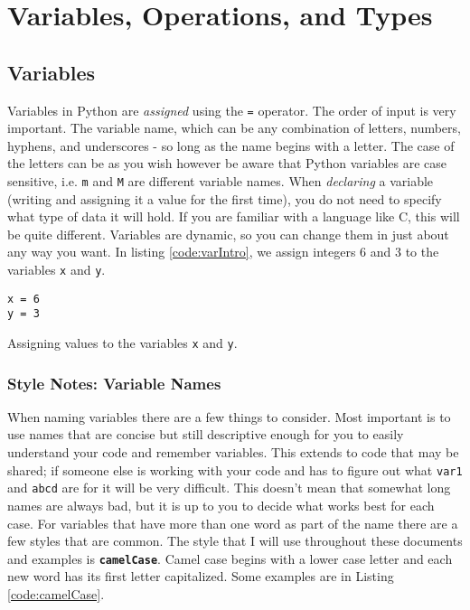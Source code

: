 \documentclass{book}
\begin{document}
\section{Variables, Operations, and Types}\label{sec:vars-types-ops}

\subsection{Variables}

Variables in Python are \textit{assigned} using the \texttt{=} operator. The order of input is very important. The variable name, which can be any combination of letters, numbers, hyphens, and underscores - so long as the name begins with a letter. The case of the letters can be as you wish however be aware that Python variables are case sensitive, i.e. \texttt{m} and \texttt{M} are different variable names. When \textit{declaring} a variable (writing and assigning it a value for the first time), you do not need to specify what type of data it will hold. If you are familiar with a language like C, this will be quite different. Variables are dynamic, so you can change them in just about any way you want. In listing \ref{code:varIntro}, we assign integers 6 and 3 to the variables \texttt{x} and \texttt{y}.

%
\begin{listing}[htb]
\begin{mdframed}[backgroundcolor=codebg]
\begin{verbatim}
x = 6
y = 3
\end{verbatim}
\end{mdframed}
\caption{Assigning values to the variables \texttt{x} and \texttt{y}.}
\label{code:varIntro}
\end{listing}

\subsubsection*{Style Notes: Variable Names}
When naming variables there are a few things to consider. Most important is to use names that are concise but still descriptive enough for you to easily understand your code and remember variables. This extends to code that may be shared; if someone else is working with your code and has to figure out what \texttt{var1} and \texttt{abcd} are for it will be very difficult. This doesn't mean that somewhat long names are always bad, but it is up to you to decide what works best for each case. For variables that have more than one word as part of the name there are a few styles that are common. The style that I will use throughout these documents and examples is \textbf{\texttt{camelCase}}. Camel case begins with a lower case letter and each new word has its first letter capitalized. Some examples are in Listing \ref{code:camelCase}.
\end{document}
